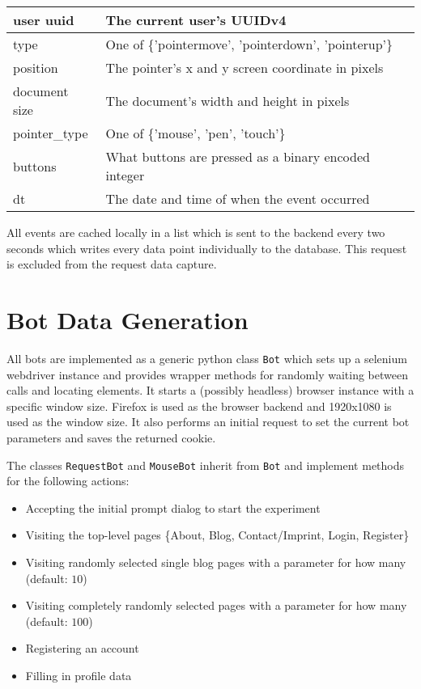 \documentclass[
    fontsize=12pt,
    headings=small,
    parskip=half,           %
    bibliography=totoc,
    numbers=noenddot,       %
    open=any,               %
    final                   %
    ]{scrreprt}
\begin{document}
\begin{table}[]
\begin{tabular}{|l|l|}
\hline
user uuid & The current user's UUIDv4 \\ \hline
type & One of \{'pointermove', 'pointerdown', 'pointerup'\} \\ \hline
position & The pointer's x and y screen coordinate in pixels \\ \hline
document size & The document's width and height in pixels \\ \hline
pointer_type & One of \{'mouse', 'pen', 'touch'\} \\ \hline
buttons & What buttons are pressed as a binary encoded integer \\ \hline
dt & The date and time of when the event occurred \\ \hline

\end{tabular}
\end{table}

All events are cached locally in a list which is sent to the backend every two seconds which writes every data point individually to the database. This request is excluded from the request data capture.

\chapter{Bot Data Generation}

All bots are implemented as a generic python class \lstinline{Bot} which sets up a selenium\cite{SELENIUMPYTHON} webdriver instance and provides wrapper methods for randomly waiting between calls and locating elements. It starts a (possibly headless) browser instance with a specific window size. Firefox is used as the browser backend and 1920x1080 is used as the window size. It also performs an initial request to set the current bot parameters and saves the returned cookie.


The classes \lstinline{RequestBot} and \lstinline{MouseBot} inherit from \lstinline{Bot} and implement methods for the following actions:

\begin{itemize}
	\item Accepting the initial prompt dialog to start the experiment
	\item Visiting the top-level pages \{About, Blog, Contact/Imprint, Login, Register\}
	\item Visiting randomly selected single blog pages with a parameter for how many (default: $10$)
	\item Visiting completely randomly selected pages with a parameter for how many (default: $100$)
	\item Registering an account
	\item Filling in profile data
\end{itemize}
\end{document}
